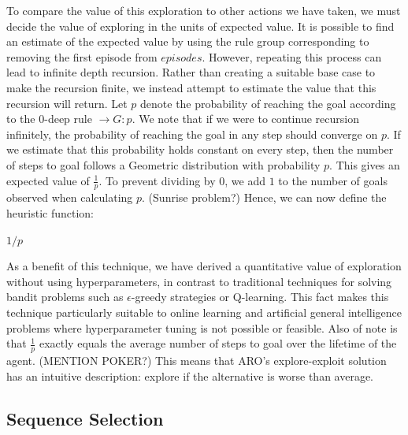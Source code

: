 \documentclass[letterpaper]{article} %
\begin{document}
To compare the value of this exploration to other actions we have taken, we must decide the value of exploring in the units of expected value.  It is possible to find an estimate of the expected value by using the rule group corresponding to removing the first episode from $episodes$. However, repeating this process can lead to infinite depth recursion. Rather than creating a suitable base case to make the recursion finite, we instead attempt to estimate the value that this recursion will return. Let $p$ denote the probability of reaching the goal according to the $0$-deep rule $\rightarrow G : p$. We note that if we were to continue recursion infinitely, the probability of reaching the goal in any step should converge on $p$. If we estimate that this probability holds constant on every step, then the number of steps to goal follows a Geometric distribution with probability $p$. This gives an expected value of $\frac{1}{p}$. To prevent dividing by $0$, we add $1$ to the number of goals observed when calculating $p$. (Sunrise problem?) Hence, we can now define the heuristic function:

\begin{algorithmic}[-1]
	
		\State \Return $1/p$
	\EndFunction
	
\end{algorithmic}

As a benefit of this technique, we have derived a quantitative value of exploration without using hyperparameters, in contrast to traditional techniques for solving bandit problems such as $\epsilon$-greedy strategies or Q-learning. This fact makes this technique particularly suitable to online learning and artificial general intelligence problems where hyperparameter tuning is not possible or feasible. Also of note is that $\frac{1}{p}$ exactly equals the average number of steps to goal over the lifetime of the agent. (MENTION POKER?) This means that ARO's explore-exploit solution has an intuitive description: explore if the alternative is worse than average.

\subsection{Sequence Selection}
\end{document}
